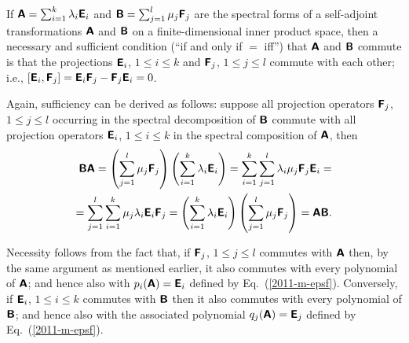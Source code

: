 If $\textsf{\textbf{A}}=\sum_{i=1}^k \lambda_i\textsf{\textbf{E}}_i$
and
$\textsf{\textbf{B}}=\sum_{j=1}^l \mu_j\textsf{\textbf{F}}_j$
are the spectral forms of a self-adjoint transformations
$\textsf{\textbf{A}}$ and $\textsf{\textbf{B}}$
on a finite-dimensional inner product space,
then a necessary and sufficient condition (``if and only if $=$ iff'')
that  $\textsf{\textbf{A}}$ and
 $\textsf{\textbf{B}}$ commute
is that the projections
$\textsf{\textbf{E}}_i$, $1\le i\le k$
and
$\textsf{\textbf{F}}_j$, $1\le j\le l$
commute with each other; i.e.,
$\left[\textsf{\textbf{E}}_i,\textsf{\textbf{F}}_j\right] =
\textsf{\textbf{E}}_i \textsf{\textbf{F}}_j-
\textsf{\textbf{F}}_j\textsf{\textbf{E}}_i =0 $.

{%
Again, sufficiency can be derived as follows: suppose all projection operators $\textsf{\textbf{F}}_j$, $1\le j\le l$
occurring in the spectral decomposition of $\textsf{\textbf{B}}$
commute with all projection operators $\textsf{\textbf{E}}_i$, $1\le i\le k$
in the spectral composition of   $\textsf{\textbf{A}}$,
then
\begin{equation}
\begin{split}
 \textsf{\textbf{B}}\textsf{\textbf{A}}
=
\left(\sum_{j=1}^l \mu_j\textsf{\textbf{F}}_j\right) \left(\sum_{i=1}^k \lambda_i \textsf{\textbf{E}}_i\right)
=
\sum_{i=1}^k \sum_{j=1}^l \lambda_i \mu_j \textsf{\textbf{F}}_j\textsf{\textbf{E}}_i
=
\\
=
\sum_{j=1}^l \sum_{i=1}^k \mu_j \lambda_i \textsf{\textbf{E}}_i \textsf{\textbf{F}}_j
=
\left(\sum_{i=1}^k \lambda_i \textsf{\textbf{E}}_i \right)  \left(\sum_{j=1}^l \mu_j \textsf{\textbf{F}}_j\right)
=\textsf{\textbf{A}} \textsf{\textbf{B}}
.
\end{split}
\end{equation}


Necessity follows from the fact that, if $\textsf{\textbf{F}}_j$, $1\le j\le l$
commutes with  $\textsf{\textbf{A}}$
then, by the same argument as mentioned earlier,
it also commutes with every polynomial of  $\textsf{\textbf{A}}$;
and
hence also with $p_i(\textsf{\textbf{A}})=\textsf{\textbf{E}}_i$ defined by Eq.~(\ref{2011-m-epsf}).
Conversely,
if $\textsf{\textbf{E}}_i$, $1\le i\le k$
commutes with  $\textsf{\textbf{B}}$
then it also commutes with every polynomial of  $\textsf{\textbf{B}}$;
and
hence also with the associated polynomial
$q_j(\textsf{\textbf{A}})=\textsf{\textbf{E}}_j$ defined by Eq.~(\ref{2011-m-epsf}).
}



